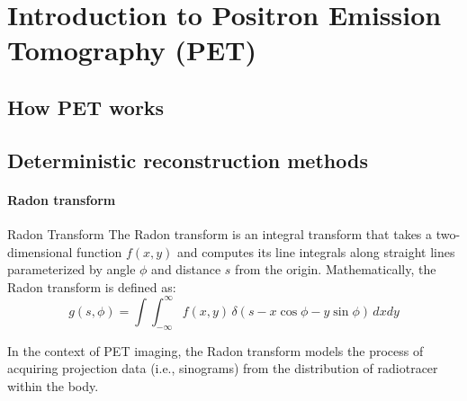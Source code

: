 \section{Introduction to Positron Emission Tomography (PET)}

\subsection{How PET works}

\subsection{Deterministic reconstruction methods}

\paragraph{Radon transform}

\begin{definition}{Radon Transform}
\label{def:radon_transform}
    The Radon transform is an integral transform that takes a two-dimensional function $f(x,y)$ and computes its line integrals along straight lines parameterized by angle $\phi$ and distance $s$ from the origin.
    Mathematically, the Radon transform is defined as:
    \begin{equation}
        g(s, \phi) = \int \int_{-\infty}^{\infty} f(x,y) \, \delta(s - x \cos \phi - y \sin \phi) \, dx dy
    \end{equation}
\end{definition}

In the context of PET imaging, the Radon transform models the process of acquiring projection data (i.e., sinograms) from the distribution of radiotracer within the body.

